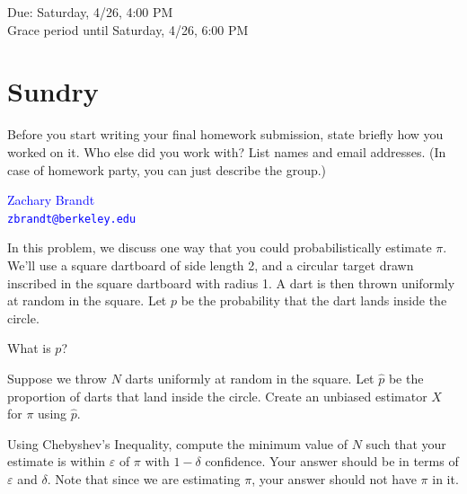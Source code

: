 \documentclass[11pt]{article}
\begin{document}
\maketitle
\fontsize{12}{15}\selectfont

\begin{center}
    Due: Saturday, 4/26, 4:00 PM \\
    Grace period until Saturday, 4/26, 6:00 PM \\
\end{center}

\section*{Sundry}
Before you start writing your final homework submission, state briefly how you 
worked on it. Who else did you work with?  List names and email addresses. (In 
case of homework party, you can just describe the group.)

\begin{center}
    \textcolor{blue}{
        Zachary Brandt \\
        \nolinkurl{zbrandt@berkeley.edu}
    }
\end{center}

\vspace{15pt}


In this problem, we discuss one way that you could probabilistically estimate 
$\pi$. We'll use a square dartboard of side length 2, and a circular target 
drawn inscribed in the square dartboard with radius 1. A dart is then thrown 
uniformly at random in the square. Let $p$ be the probability that the dart 
lands inside the circle.

\begin{Parts}
    \item What is $p$?
	\item Suppose we throw $N$ darts uniformly at random in the square. Let 
    $\hat{p}$ be the proportion of darts that land inside the circle. Create an 
    unbiased estimator $X$ for $\pi$ using $\hat{p}$.
	\item Using Chebyshev's Inequality, compute the minimum value of $N$ such 
    that your estimate is within $\varepsilon$ of $\pi$ with $1 - \delta$ 
    confidence. Your answer should be in terms of $\varepsilon$ and $\delta$. 
    Note that since we are estimating $\pi$, your answer should not have $\pi$ 
    in it.
\end{Parts}
\end{document}

